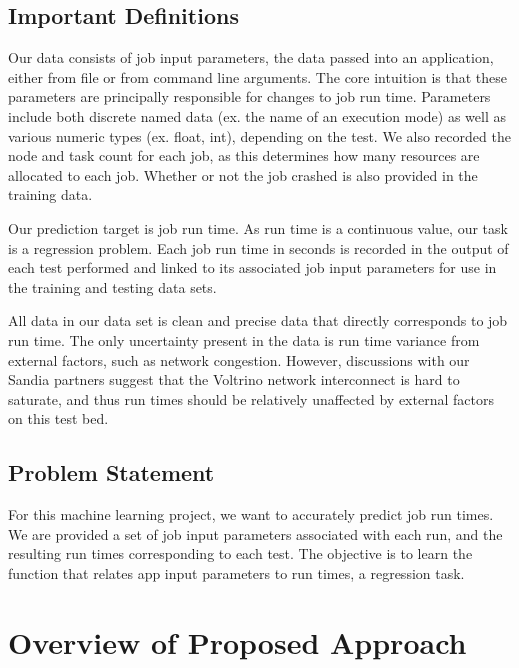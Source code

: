 \documentclass[conference, 10pt, onecolumn, draftclsnofoot]{IEEEtran}
\begin{document}
\subsection{Important Definitions}

Our data consists of job input parameters, the data passed into an application, either from file or from command line arguments.
The core intuition is that these parameters are principally responsible for changes to job run time.
Parameters include both discrete named data (ex. the name of an execution mode) as well as various numeric types (ex. float, int), depending on the test.
We also recorded the node and task count for each job, as this determines how many resources are allocated to each job.
Whether or not the job crashed is also provided in the training data.

Our prediction target is job run time.
As run time is a continuous value, our task is a regression problem.
Each job run time in seconds is recorded in the output of each test performed and linked to its associated job input parameters for use in the training and testing data sets.

All data in our data set is clean and precise data that directly corresponds to job run time.
The only uncertainty present in the data is run time variance from external factors, such as network congestion.
However, discussions with our Sandia partners suggest that the Voltrino network interconnect is hard to saturate, and thus run times should be relatively unaffected by external factors on this test bed.

\subsection{Problem Statement}

For this machine learning project, we want to accurately predict job run times.
We are provided a set of job input parameters associated with each run, and the resulting run times corresponding to each test.
The objective is to learn the function that relates app input parameters to run times, a regression task.

\section{Overview of Proposed Approach}
\end{document}
